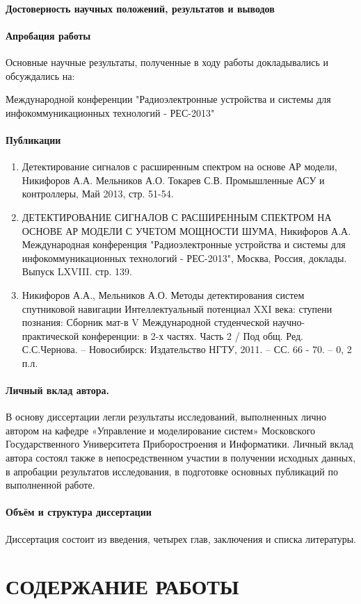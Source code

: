 \paragraph{Достоверность научных положений, результатов и выводов}

\paragraph{Апробация работы}
Основные научные результаты, полученные в ходу работы докладывались и обсуждались на:

Международной конференции "Радиоэлектронные устройства и системы для инфокоммуникационных технологий - РЕС-2013"

\paragraph{Публикации}
\begin{enumerate}
	\item Детектирование сигналов с расширенным спектром на основе АР модели, Никифоров А.А. Мельников А.О. Токарев С.В. Промышленные АСУ и контроллеры, Май 2013, стр. 51-54.
	\item ДЕТЕКТИРОВАНИЕ СИГНАЛОВ С РАСШИРЕННЫМ СПЕКТРОМ НА ОСНОВЕ АР МОДЕЛИ С УЧЕТОМ МОЩНОСТИ ШУМА, Никифоров А.А. Международная конференция
		"Радиоэлектронные устройства и системы для инфокоммуникационных технологий - РЕС-2013", Москва, Россия, доклады. Выпуск LXVIII. стр. 139.
	\item Никифоров А.А., Мельников А.О. Методы детектирования систем спутниковой навигации Интеллектуальный потенциал XXI века: ступени познания:
		Сборник мат-в V Международной студенческой научно-практической конференции: в 2-х частях. Часть 2 / Под общ. Ред. С.С.Чернова. – Новосибирск:
		Издательство НГТУ, 2011. – СС. 66 - 70. – 0, 2 п.л.
\end{enumerate}

\paragraph{Личный вклад автора.}
В основу диссертации легли результаты исследований, выполненных лично автором на кафедре «Управление и моделирование систем» Московского Государственного
Университета Приборостроения и Информатики. Личный вклад автора состоял также в непосредственном участии в получении исходных данных, в апробации результатов исследования,
в подготовке основных публикаций по выполненной работе.

\paragraph{Объём и структура диссертации}
Диссертация состоит из введения, четырех глав, заключения и списка литературы.

\section*{СОДЕРЖАНИЕ РАБОТЫ}





%




\newpage

